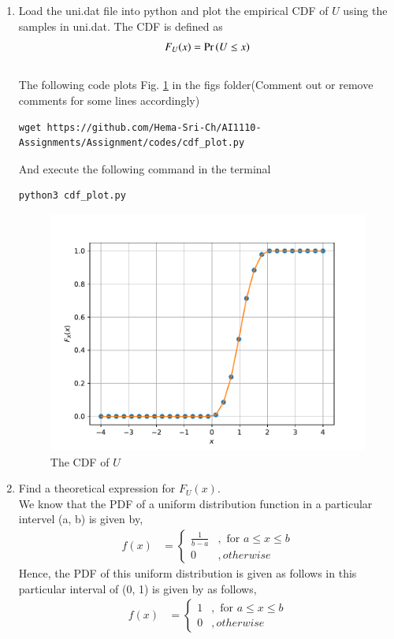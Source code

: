 \documentclass[journal,12pt,twocolumn]{article}
\renewcommand\thesection{\arabic{section}}
\begin{document}
\begin{enumerate}[label=\thesection.\arabic*
,ref=\thesection.\theenumi]
\item
Load the uni.dat file into python and plot the empirical CDF of $U$ using the samples in uni.dat. The CDF is defined as
\begin{align}
F_{U}(x) = \Pr\left(U \le x\right)
\end{align}
\\
\solution  The following code plots Fig. \ref{fig:uni_cdf} in the figs folder(Comment out or remove comments for some lines accordingly)
\begin{lstlisting}
wget https://github.com/Hema-Sri-Ch/AI1110-Assignments/Assignment/codes/cdf_plot.py
\end{lstlisting}
And execute the following command in the terminal 
\begin{lstlisting}
python3 cdf_plot.py
\end{lstlisting}
\begin{figure}[h]
	\centering
	\includegraphics[width=\columnwidth]{uni_cdf}
	\caption{The CDF of $U$}
	\label{fig:uni_cdf}
\end{figure}
%
\item
Find a  theoretical expression for $F_{U}(x)$.
\\
\solution We know that the PDF of a uniform distribution function in a particular intervel (a, b) is given by,
\begin{align}
	f(x) &= \begin{cases} \frac{1}{b-a} &,\text{ for } a \leq x \leq b \\
	0 &, otherwise\end{cases}
\end{align}
Hence, the PDF of this uniform distribution is given as follows in this particular interval of (0, 1) is given by as follows,
\begin{align}
	f(x) &= \begin{cases} 1 &,\text{ for } a \leq x \leq b \\
	0 &, otherwise\end{cases}
\end{align}


\end{enumerate}
\end{document}
